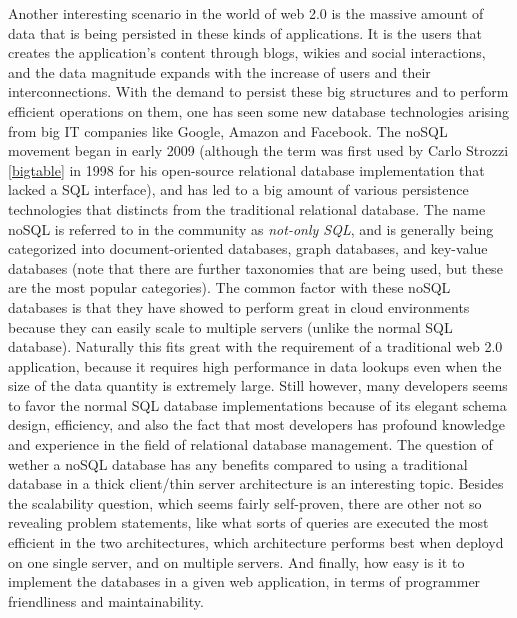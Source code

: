         Another interesting scenario in the world of web 2.0 is the
        massive amount of data that is being persisted in these kinds
        of applications. It is the users that creates the
        application's content through blogs, wikies and social
        interactions, and the data magnitude expands with the increase of
        users and their interconnections. With the demand to persist
        these big structures and to perform efficient operations on
        them, one has seen some new database technologies arising from
        big IT companies like Google, Amazon and Facebook.
The noSQL movement began in early 2009 (although the term was
first used by Carlo Strozzi \ref{bigtable} in 1998 
for his open-source relational database implementation that lacked a SQL interface), and has led to a
big amount of various persistence technologies that
        distincts from the traditional relational
        database. The name noSQL is referred to in the community as
        \textit{not-only SQL}, and is generally being categorized into 
        document-oriented databases, graph databases, and
        key-value databases (note that there are further taxonomies that
        are being used, but these are the most popular categories).
        The common factor with these noSQL
        databases is that they have showed to perform great in cloud
        environments because they can easily scale to multiple servers
        (unlike the normal SQL database). Naturally this fits great
        with the requirement of a traditional web 2.0 application,
        because it requires high performance in data lookups even when
        the size of the data quantity is extremely large. Still
        however, many developers seems to favor the normal SQL
        database implementations because of its elegant schema design,
        efficiency, and also the fact that most developers has
        profound knowledge and experience in the field of relational database
        management. The question of wether a noSQL database
        has any benefits compared to using a traditional
        database in a thick client/thin server architecture is an
        interesting topic. Besides the scalability question, which
        seems fairly self-proven, there are other not so revealing
        problem statements, like what sorts of queries are executed the most
        efficient in the two architectures, which architecture
        performs best when deployd on one single server, and on multiple servers. And
        finally, how easy is it to implement the databases
        in a given web application, in terms of programmer
        friendliness and maintainability.   
	
